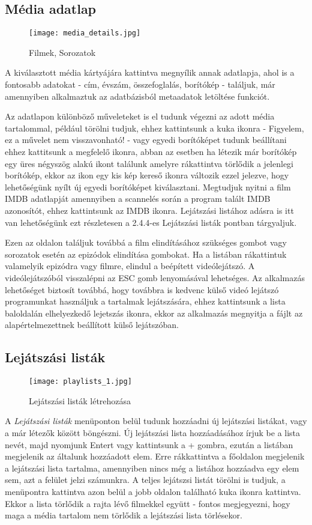 \subsection{Média adatlap}
\begin{figure}[H]
	\centering
	\texttt{[image: media\_details.jpg]}
	\caption{Filmek, Sorozatok}
	\label{fig:media_details}
\end{figure}
A kiválasztott média kártyájára kattintva megnyílik annak adatlapja, ahol is a fontosabb adatokat - cím, évszám, összefoglalás, borítókép - találjuk, már amennyiben alkalmaztuk az adatbázisból metaadatok letöltése funkciót.

Az adatlapon különböző műveleteket is el tudunk végezni az adott média tartalommal, például törölni tudjuk, ehhez kattintsunk a kuka ikonra - Figyelem, ez a művelet nem visszavonható! - vagy egyedi borítóképet tudunk beállítani ehhez kattitsunk a megfelelő ikonra, abban az esetben ha létezik már borítókép egy üres négyszög alakú ikont találunk amelyre rákattintva törlődik a jelenlegi borítókép, ekkor az ikon egy kis kép kereső ikonra változik ezzel jelezve, hogy lehetőségünk nyílt új egyedi borítóképet kiválasztani. Megtudjuk nyitni a film IMDB adatlapját amennyiben a scannelés során a program talált IMDB azonosítót, ehhez kattintsunk az IMDB ikonra. Lejátszási listához adásra is itt van lehetőségünk ezt részletesen a 2.4.4-es Lejátszási listák pontban tárgyaljuk.

Ezen az oldalon találjuk továbbá a film elindításához szükséges gombot vagy sorozatok esetén az epizódok elindítása gombokat. Ha a listában rákattintuk valamelyik epizódra vagy filmre, elindul a beépített videólejátszó. A videólejátszóból visszalépni az ESC gomb lenyomásával lehetséges. Az alkalmazás lehetőséget biztosít továbbá, hogy továbbra is kedvenc külső videó lejátszó programunkat használjuk a tartalmak lejátszására, ehhez kattintsunk a lista baloldalán elhelyezkedő lejetszás ikonra, ekkor az alkalmazás megnyitja a fájlt az alapértelmezettnek beállított külső lejátszóban.

\subsection{Lejátszási listák}
\begin{figure}[H]
	\centering
	\texttt{[image: playlists\_1.jpg]}
	\caption{Lejátszási listák létrehozása}
	\label{fig:playlists_1}
\end{figure}
A {\it Lejátszási listák} menüponton belül tudunk hozzáadni új lejátszási listákat, vagy a már létezők között böngészni. Új lejátszási lista hozzáadásához írjuk be a lista nevét, majd nyomjunk Entert vagy kattintsunk a + gombra, ezután a listában megjelenik az általunk hozzáadott elem. Erre rákkattintva a főoldalon megjelenik a lejátszási lista tartalma, amennyiben nincs még a listához hozzáadva egy elem sem, azt a felület jelzi számunkra. A teljes lejátszsi listát törölni is tudjuk, a menüpontra kattintva azon belül a jobb oldalon található kuka ikonra kattintva. Ekkor a lista törlődik a rajta lévő filmekkel együtt - fontos megjegyezni, hogy maga a média tartalom nem törlődik a lejátszási lista törlésekor.


